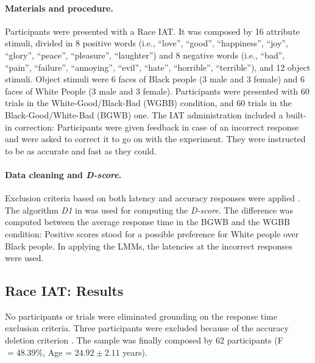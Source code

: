 \documentclass[12pt]{book}
\begin{document}
\paragraph{Materials and procedure.}
Participants were presented with a Race IAT. It was composed by 16 attribute stimuli, divided in 8 positive words (i.e., ``love'',  ``good'', ``happiness'', ``joy'', ``glory'', ``peace'', ``pleasure'', ``laughter'') and 8 negative words (i.e., ``bad'', ``pain'', ``failure'', ``annoying'', ``evil'', ``hate'', ``horrible'', ``terrible''), and 12 object stimuli. Object stimuli \cite<same as in Study 2 of>{nosek2005} were 6 faces of Black people (3 male and 3 female) and 6 faces of White People (3 male and 3 female). Participants were presented with 60 trials in the White-Good/Black-Bad (WGBB) condition, and 60 trials in the Black-Good/White-Bad (BGWB) one. The IAT administration included a built-in correction: Participants were given feedback in case of an incorrect response and were asked to correct it to go on with the experiment. They were instructed to be as accurate and fast as they could. 

\paragraph{Data cleaning and \emph{D-score}.}
Exclusion criteria based on both latency and accuracy responses were applied \cite{Greenwald2003, Nosek2002}. 
The algorithm \emph{D1} in  was used for computing the \emph{D-score}. The difference was computed between the average response time in the BGWB and the WGBB condition: Positive scores stood for a possible preference for White people over Black people. In applying the LMMs, the latencies at the incorrect responses were used. 

\subsection{Race IAT: Results}
No participants or trials were eliminated grounding on the response time exclusion criteria. Three participants were excluded because of the accuracy deletion criterion \cite{Nosek2002}. 
The sample was finally composed by 62 participants (F $=48.39$\%, Age = $24.92\pm2.11$ years).
\end{document}
